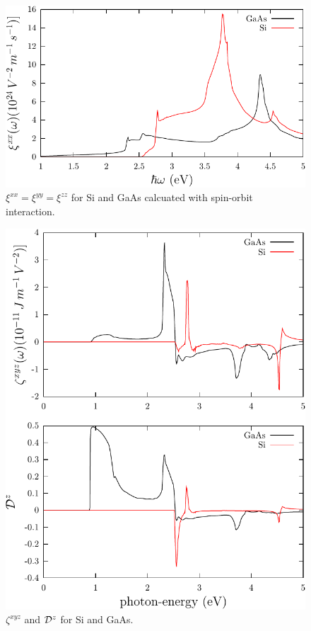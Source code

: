\documentclass[12pt]{article}
\numberwithin{equation}{section}
\begin{document}
\begin{figure}[t]
\begin{center}
\includegraphics[scale=.7]{plots/xi}
\end{center}
\caption{$\xi^{xx}=\xi^{yy}=\xi^{zz}$ for Si and GaAs 
  calcuated with spin-orbit interaction. 
}
\label{fig:xi}
\end{figure}
\begin{figure}[h]
\begin{center}
\includegraphics[scale=.5]{plots/zeta}
\end{center}
\caption{$\zeta^{xyz}$ and ${\cal D}^z$ for Si and GaAs. 
}
\label{fig:zeta}
\end{figure}
\end{document}
